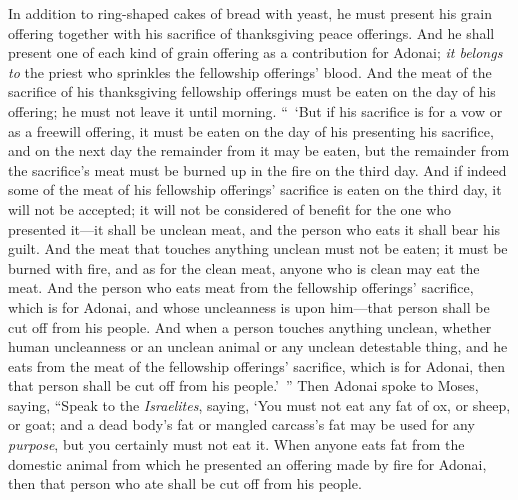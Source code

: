 \begin{biblechapter}
\verse In addition to ring-shaped cakes of bread with yeast, he must present his grain offering together with his sacrifice of thanksgiving peace offerings.
\verse And he shall present one of each kind of grain offering as a contribution for Adonai; \textit{it belongs to} the priest who sprinkles the fellowship offerings’ blood.
\verse And the meat of the sacrifice of his thanksgiving fellowship offerings must be eaten on the day of his offering; he must not leave it until morning.
\verse “ ‘But if his sacrifice is for a vow or as a freewill offering, it must be eaten on the day of his presenting his sacrifice, and on the next day the remainder from it may be eaten,
\verse but the remainder from the sacrifice’s meat must be burned up in the fire on the third day.
\verse And if indeed some of the meat of his fellowship offerings’ sacrifice is eaten on the third day, it will not be accepted; it will not be considered of benefit for the one who presented it—it shall be unclean meat, and the person who eats it shall bear his guilt.
\verse And the meat that touches anything unclean must not be eaten; it must be burned with fire, and as for the clean meat, anyone who is clean may eat the meat.
\verse And the person who eats meat from the fellowship offerings’ sacrifice, which is for Adonai, and whose uncleanness is upon him—that person shall be cut off from his people.
\verse And when a person touches anything unclean, whether human uncleanness or an unclean animal or any unclean detestable thing, and he eats from the meat of the fellowship offerings’ sacrifice, which is for Adonai, then that person shall be cut off from his people.’ ”
 Then Adonai spoke to Moses, saying,
\verse “Speak to the \textit{Israelites}, saying, ‘You must not eat any fat of ox, or sheep, or goat;
\verse and a dead body’s fat or mangled carcass’s fat may be used for any \textit{purpose}, but you certainly must not eat it.
\verse When anyone eats fat from the domestic animal from which he presented an offering made by fire for Adonai, then that person who ate shall be cut off from his people.

\end{biblechapter}
